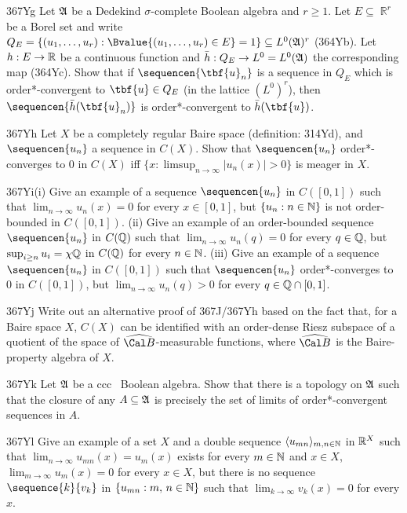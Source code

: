 {\spheader 367Yg Let $\frak A$ be a Dedekind $\sigma$-complete Boolean
algebra and $r\ge 1$.   Let $E\subseteq\BbbR^r$ be a Borel set and
write $Q_E=\{(u_1,\ldots,u_r):\Bvalue{(u_1,\ldots,u_r)\in E}=1\}
\subseteq L^0(\frak A)^r$ (364Yb).   Let $h:E\to\Bbb R$ be a
continuous function and $\bar h:Q_E\to L^0=L^0(\frak A)$ the 
corresponding map
(364Yc).   Show that if $\sequencen{\tbf{u}_n}$ is a sequence in $Q_E$
which is order*-convergent to $\tbf{u}\in Q_E$ (in the lattice
$(L^0)^r$), then $\sequencen{\bar h(\tbf{u}_n)}$ is
order*-convergent to $\bar h(\tbf{u})$.
     
\spheader 367Yh Let $X$ be a completely regular Baire space (definition:
314Yd), and $\sequencen{u_n}$ a sequence in $C(X)$.   Show
that $\sequencen{u_n}$ order*-converges to $0$ in $C(X)$ iff
$\{x:\limsup_{n\to\infty}|u_n(x)|>0\}$ is meager in $X$.
     
\spheader 367Yi(i) Give an example of a sequence $\sequencen{u_n}$ in
$C([0,1])$ such that $\lim_{n\to\infty}u_n(x)=0$ for every $x\in[0,1]$,
but $\{u_n:n\in\Bbb N\}$ is not order-bounded in $C([0,1])$.   (ii) Give
an example of an order-bounded sequence $\sequencen{u_n}$ in $C(\Bbb Q)$
such that $\lim_{n\to\infty}u_n(q)=0$ for every $q\in\Bbb Q$, but
$\sup_{i\ge
n}u_i=\chi\Bbb Q$ in $C(\Bbb Q)$ for every $n\in\Bbb N$.   (iii) Give an
example of a sequence $\sequencen{u_n}$ in $C([0,1])$ such that
$\sequencen{u_n}$ order*-converges to $0$ in $C([0,1])$, but
$\lim_{n\to\infty}u_n(q)>0$ for every $q\in\Bbb Q\cap[0,1]$.
     
\spheader 367Yj Write out an alternative proof of 367J/367Yh based on
the fact that, for a Baire space $X$, $C(X)$ can be identified with an
order-dense Riesz subspace of a quotient of the space of
$\widehat{\Cal B}$-measurable functions, where $\widehat{\Cal B}$ is the 
Baire-property algebra of $X$.
     
\spheader 367Yk Let $\frak A$ be a ccc \wsid\
Boolean algebra.   Show that there is a topology on $\frak A$ such that
the closure of any $A\subseteq\frak A$ is precisely the set of limits of
order*-convergent sequences in $A$.
     
\spheader 367Yl Give an example of a set $X$ and a double sequence
$\langle u_{mn}\rangle_{m,n\in\Bbb N}$ in $\Bbb R^X$ such that
$\lim_{n\to\infty}u_{mn}(x)=u_m(x)$ exists for every $m\in\Bbb N$ and
$x\in X$, $\lim_{m\to\infty}u_m(x)=0$ for every $x\in X$, but there is
no sequence $\sequence{k}{v_k}$ in $\{u_{mn}:m,\,n\in\Bbb N\}$ such that
$\lim_{k\to\infty}v_k(x)=0$ for every $x$.
     
}
